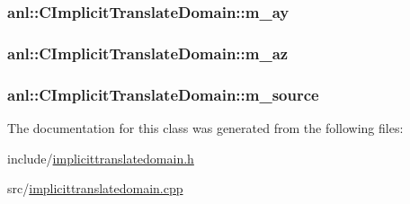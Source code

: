 \label{classanl_1_1CImplicitTranslateDomain_a7a2ea3e6352fc5b7115cc190f7e194b1}
\hypertarget{classanl_1_1CImplicitTranslateDomain_a74f51a5c750b8c54d7240fa4a484345b}{
\subsubsection[{m\_\-ay}]{ {\bf anl::CImplicitTranslateDomain::m\_\-ay}}}
\label{classanl_1_1CImplicitTranslateDomain_a74f51a5c750b8c54d7240fa4a484345b}
\hypertarget{classanl_1_1CImplicitTranslateDomain_a9208c2a3de8c895831d0fd338538dbdc}{
\subsubsection[{m\_\-az}]{ {\bf anl::CImplicitTranslateDomain::m\_\-az}}}
\label{classanl_1_1CImplicitTranslateDomain_a9208c2a3de8c895831d0fd338538dbdc}
\hypertarget{classanl_1_1CImplicitTranslateDomain_af24a9b6669d838c88bbedce9c3952963}{
\subsubsection[{m\_\-source}]{ {\bf anl::CImplicitTranslateDomain::m\_\-source}}}
\label{classanl_1_1CImplicitTranslateDomain_af24a9b6669d838c88bbedce9c3952963}


The documentation for this class was generated from the following files:\begin{DoxyCompactItemize}
\item 
include/\hyperlink{implicittranslatedomain_8h}{implicittranslatedomain.h}\item 
src/\hyperlink{implicittranslatedomain_8cpp}{implicittranslatedomain.cpp}\end{DoxyCompactItemize}
